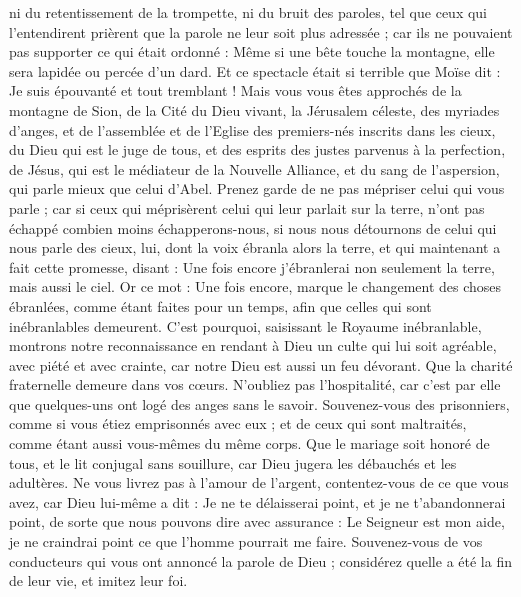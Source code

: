 \begin{multicols}{2}
ni du retentissement de la trompette, ni du bruit des paroles, tel que ceux qui l'entendirent prièrent que la parole ne leur soit plus adressée ;
car ils ne pouvaient pas supporter ce qui était ordonné : Même si une bête touche la montagne, elle sera lapidée ou percée d'un dard.
Et ce spectacle était si terrible que Moïse dit : Je suis épouvanté et tout tremblant !
Mais vous vous êtes approchés de la montagne de Sion, de la Cité du Dieu vivant, la Jérusalem céleste, des myriades d'anges,
et de l'assemblée et de l'Eglise des premiers-nés inscrits dans les cieux, du Dieu qui est le juge de tous, et des esprits des justes parvenus à la perfection,
de Jésus, qui est le médiateur de la Nouvelle Alliance, et du sang de l'aspersion, qui parle mieux que celui d'Abel.
Prenez garde de ne pas mépriser celui qui vous parle ; car si ceux qui méprisèrent celui qui leur parlait sur la terre, n’ont pas échappé combien moins échapperons-nous, si nous nous détournons de celui qui nous parle des cieux,
lui, dont la voix ébranla alors la terre, et qui maintenant a fait cette promesse, disant : Une fois encore j'ébranlerai non seulement la terre, mais aussi le ciel.
Or ce mot : Une fois encore, marque le changement des choses ébranlées, comme étant faites pour un temps, afin que celles qui sont inébranlables demeurent.
C'est pourquoi, saisissant le Royaume inébranlable, montrons notre reconnaissance en rendant à Dieu un culte qui lui soit agréable, avec piété et avec crainte,
car notre Dieu est aussi un feu dévorant.
\VerseOne{}Que la charité fraternelle demeure dans vos cœurs.
N'oubliez pas l'hospitalité, car c’est par elle que quelques-uns ont logé des anges sans le savoir.
Souvenez-vous des prisonniers, comme si vous étiez emprisonnés avec eux ; et de ceux qui sont maltraités, comme étant aussi vous-mêmes du même corps.
Que le mariage soit honoré de tous, et le lit conjugal sans souillure, car Dieu jugera les débauchés et les adultères.
Ne vous livrez pas à l’amour de l’argent, contentez-vous de ce que vous avez, car Dieu lui-même a dit : Je ne te délaisserai point, et je ne t'abandonnerai point,
de sorte que nous pouvons dire avec assurance : Le Seigneur est mon aide, je ne craindrai point ce que l'homme pourrait me faire.
Souvenez-vous de vos conducteurs qui vous ont annoncé la parole de Dieu ; considérez quelle a été la fin de leur vie, et imitez leur foi.

\end{multicols}
